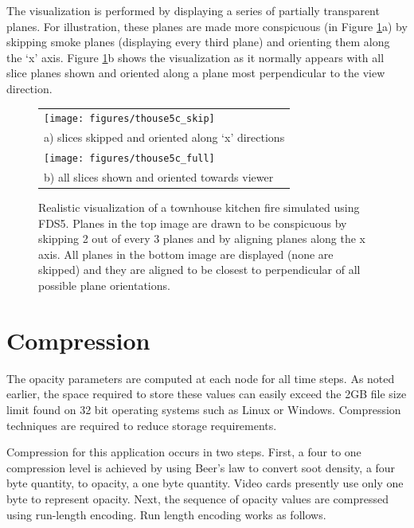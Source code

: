 \documentclass[11pt,twoside]{book}
\newcommand{\figoptions}{P}
\begin{document}
The visualization is performed by displaying a series of partially
transparent planes. For illustration, these planes are made more
conspicuous (in Figure \ref{figsmoke3d}a) by skipping smoke planes
(displaying every third plane) and orienting them along the `x'
axis. Figure \ref{figsmoke3d}b shows the visualization as it
normally appears with all slice planes shown and oriented along a
plane most perpendicular to the view direction.
\begin{figure}[\figoptions]
\begin{center}
\begin{tabular}{l}
\texttt{[image: figures/thouse5c\_skip]}\\
a) slices skipped and oriented along `x' directions\\
\texttt{[image: figures/thouse5c\_full]}\\
b) all slices shown and oriented towards viewer \\
\end{tabular}
\end{center}
\caption{Realistic visualization of a townhouse kitchen fire simulated
using FDS5. Planes in the top image are drawn to be conspicuous by
skipping 2 out of every 3 planes and by aligning planes along the
x axis. All planes in the bottom image are displayed (none are
skipped) and they are aligned to be closest to perpendicular of
all possible plane orientations.
  }
\label{figsmoke3d}%
\end{figure}

%
%

\chapter{Compression}

The opacity parameters are computed at each node for all time
steps. As noted earlier, the space required to store these values can easily exceed the 2GB file size limit found on 32
bit operating systems such as Linux or Windows.  Compression
techniques are required to reduce storage requirements.

Compression for this application occurs in two steps.  First, a four to one compression level is achieved by using Beer's
law to convert soot density, a four byte quantity, to opacity, a one byte quantity.  Video cards presently use only one byte to represent opacity.
Next, the sequence of opacity values are compressed using run-length encoding.
Run length encoding works as follows.
\end{document}
